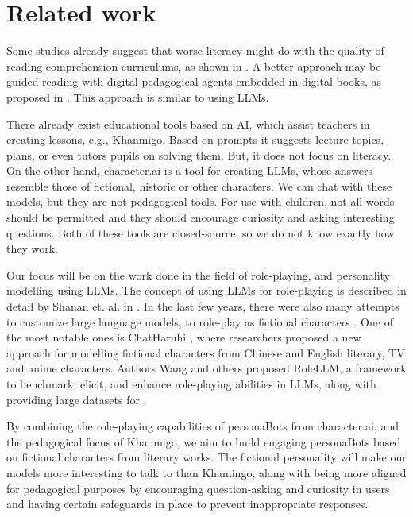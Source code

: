 \documentclass[fleqn,moreauthors,10pt]{ds_report}
\begin{document}
\section*{Related work}

Some studies already suggest that worse literacy might do with the
quality of reading comprehension curriculums, as shown in
\cite{bogaerds-hazenberg_what_2022}. A better approach may be guided 
reading with digital pedagogical agents embedded in digital books,
as proposed in \cite{nielen_digital_2018}. This approach is similar
to using LLMs.

There already exist educational tools based on AI, which assist teachers
in creating lessons, e.g., Khanmigo. Based on prompts it suggests lecture
topics, plans, or even tutors pupils on solving them. But, it does not
focus on literacy. On the other hand, character.ai is a tool for creating
LLMs, whose answers resemble those of fictional, historic or other
characters. We can chat with these models, but they are not pedagogical
tools. For use with children, not all words should be permitted and
they should encourage curiosity and asking interesting questions. Both
of these tools are closed-source, so we do not know exactly how they
work.

Our focus will be on the work done in the field of role-playing, and personality modelling using LLMs. The concept of using LLMs for role-playing is described in detail by Shanan et. al. in \cite{shanahan_role-play_2023}. 
In the last few years, there were also many attempts to customize large language models, to role-play as fictional characters \cite{li_chatharuhi_2023, wang_incharacter_2024, shao_character-llm_2023, wang_rolellm_2023, chen_large_2023}. One of the most notable ones is ChatHaruhi \cite{li_chatharuhi_2023}, where researchers proposed a new approach for modelling fictional characters from Chinese and English literary, TV and anime characters. Authors Wang and others proposed RoleLLM, a framework to benchmark, elicit,
and enhance role-playing abilities in LLMs, along with providing large datasets for \cite{wang_rolellm_2023}.

By combining the role-playing capabilities of personaBots from character.ai, and the pedagogical focus of Khanmigo, we aim to build engaging personaBots based on fictional characters from literary works. The fictional personality will make our models more interesting to talk to than Khamingo, along with being more aligned for pedagogical purposes by encouraging question-asking and curiosity in users and having certain safeguards in place to prevent inappropriate responses.




\end{document}
